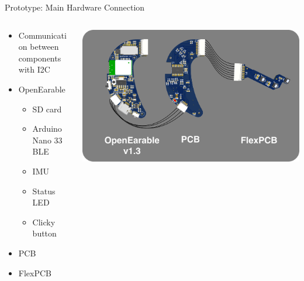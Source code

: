 \documentclass[en]{sdqbeamer}
\begin{document}
\begin{frame}{Prototype: Main Hardware Connection}
    \begin{columns}[T]
        \begin{column}{.34\textwidth}
          \begin{itemize}
              \item Communication between components with I2C
              \item OpenEarable
              \begin{itemize}
                  \item SD card
                  \item Arduino Nano 33 BLE
                  \item IMU
                  \item Status LED
                  \item Clicky button
              \end{itemize}
              \item PCB
              \item FlexPCB
          \end{itemize}
        \end{column}
        
        \begin{column}{.64\textwidth}
          \includegraphics[width=0.95\linewidth]{../thesis-doc/images/prototype/PrototypeConnection.png}
        \end{column}
      \end{columns}
\end{frame}
\end{document}
